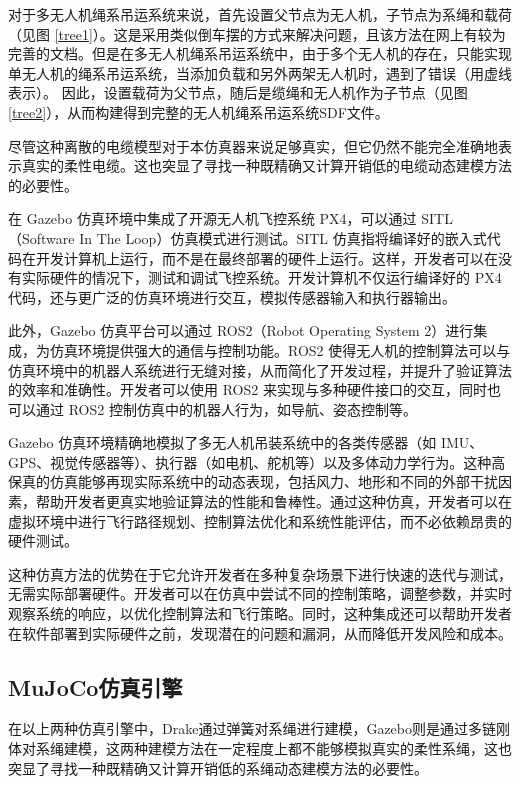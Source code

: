 \documentclass[lang=chs, degree=master, blindreview=false, winfonts=true]{yanputhesis}
\begin{document}
对于多无人机绳系吊运系统来说，首先设置父节点为无人机，子节点为系绳和载荷（见图 \ref{tree1}）。这是采用类似倒车摆的方式来解决问题，且该方法在网上有较为完善的文档。但是在多无人机绳系吊运系统中，由于多个无人机的存在，只能实现单无人机的绳系吊运系统，当添加负载和另外两架无人机时，遇到了错误（用虚线表示）。
因此，设置载荷为父节点，随后是缆绳和无人机作为子节点（见图 \ref{tree2}），从而构建得到完整的无人机绳系吊运系统SDF文件。

尽管这种离散的电缆模型对于本仿真器来说足够真实，但它仍然不能完全准确地表示真实的柔性电缆。这也突显了寻找一种既精确又计算开销低的电缆动态建模方法的必要性。

在 Gazebo 仿真环境中集成了开源无人机飞控系统 PX4，可以通过 SITL（Software In The Loop）仿真模式进行测试。SITL 仿真指将编译好的嵌入式代码在开发计算机上运行，而不是在最终部署的硬件上运行。这样，开发者可以在没有实际硬件的情况下，测试和调试飞控系统。开发计算机不仅运行编译好的 PX4 代码，还与更广泛的仿真环境进行交互，模拟传感器输入和执行器输出。

此外，Gazebo 仿真平台可以通过 ROS2（Robot Operating System 2）进行集成，为仿真环境提供强大的通信与控制功能。ROS2 使得无人机的控制算法可以与仿真环境中的机器人系统进行无缝对接，从而简化了开发过程，并提升了验证算法的效率和准确性。开发者可以使用 ROS2 来实现与多种硬件接口的交互，同时也可以通过 ROS2 控制仿真中的机器人行为，如导航、姿态控制等。

Gazebo 仿真环境精确地模拟了多无人机吊装系统中的各类传感器（如 IMU、GPS、视觉传感器等）、执行器（如电机、舵机等）以及多体动力学行为。这种高保真的仿真能够再现实际系统中的动态表现，包括风力、地形和不同的外部干扰因素，帮助开发者更真实地验证算法的性能和鲁棒性。通过这种仿真，开发者可以在虚拟环境中进行飞行路径规划、控制算法优化和系统性能评估，而不必依赖昂贵的硬件测试。

这种仿真方法的优势在于它允许开发者在多种复杂场景下进行快速的迭代与测试，无需实际部署硬件。开发者可以在仿真中尝试不同的控制策略，调整参数，并实时观察系统的响应，以优化控制算法和飞行策略。同时，这种集成还可以帮助开发者在软件部署到实际硬件之前，发现潜在的问题和漏洞，从而降低开发风险和成本。

\subsection{MuJoCo仿真引擎}

在以上两种仿真引擎中，Drake通过弹簧对系绳进行建模，Gazebo则是通过多链刚体对系绳建模，这两种建模方法在一定程度上都不能够模拟真实的柔性系绳，这也突显了寻找一种既精确又计算开销低的系绳动态建模方法的必要性。
\end{document}
